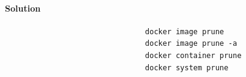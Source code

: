 \documentclass[12pt]{article}
\begin{document}
					\paragraph{Solution}	
				
						\begin{minipage}{\linewidth}
							\begin{lstlisting}
								docker image prune
								docker image prune -a
								docker container prune
								docker system prune
							\end{lstlisting}
						\end{minipage}
				
\end{document}
